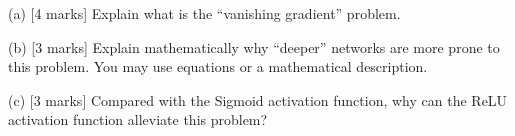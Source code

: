 (a) [4 marks] Explain what is the “vanishing gradient” problem.


(b) [3 marks] Explain mathematically why “deeper” networks are more prone to this problem. You may use equations or a mathematical description.


(c) [3 marks] Compared with the Sigmoid activation function, why can the ReLU activation function alleviate this problem?
